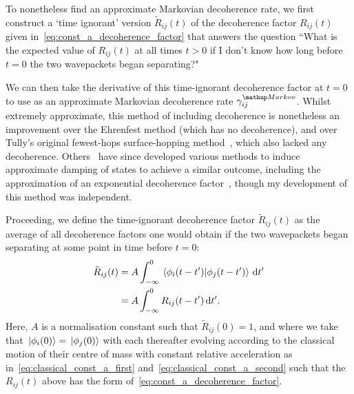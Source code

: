 To nonetheless find an approximate Markovian decoherence rate, we first construct a `time ignorant' version $\tilde R_{ij}(t)$ of the decoherence factor $R_{ij}(t)$ given in~\eqref{eq:const_a_decoherence_factor} that answers the question ``What is the expected value of $R_{ij}(t)$ at all times $t > 0$ if I don't know how long before $t=0$ the two wavepackets began separating?" 

We can then take the derivative of this time-ignorant decoherence factor at $t=0$ to use as an approximate Markovian decoherence rate $\gamma_{ij}^\up{Markov}$. Whilst extremely approximate, this method of including decoherence is nonetheless an improvement over the Ehrenfest method (which has no decoherence), and over Tully's original fewest-hops surface-hopping method~\cite{doi:10.1063/1.459170}, which also lacked any decoherence. Others~\cite{doi:10.1063/1.4733675, doi:10.1063/1.1468887, doi:10.1063/1.470177} have since developed various methods to induce approximate damping of states to achieve a similar outcome, including the approximation of an exponential decoherence factor~\cite{doi:10.1063/1.4733675}, though my development of this method was independent.

Proceeding, we define the time-ignorant decoherence factor $\tilde R_{ij}(t)$ as the average of all decoherence factors one would obtain if the two wavepackets began separating at some point in time before $t=0$:
\begin{align}
\tilde R_{ij}(t) &= A\int_{-\infty}^0\braket{\phi_i(t-t^\prime)}{\phi_j(t - t^\prime)} \,\dd t^\prime\\
&= A\int_{-\infty}^0 R_{ij}(t-t^\prime) \,\dd t^\prime.
\end{align}
Here, $A$ is a normalisation constant such that $\tilde R_{ij}(0) = 1$, and where we take that $\ket{\phi_i(0)} = \ket{\phi_j(0)}$ with each thereafter evolving according to the classical motion of their centre of mass with constant relative acceleration as in~\eqref{eq:classical_const_a_first} and~\eqref{eq:classical_const_a_second} such that the $R_{ij}(t)$ above has the form of~\eqref{eq:const_a_decoherence_factor}.

